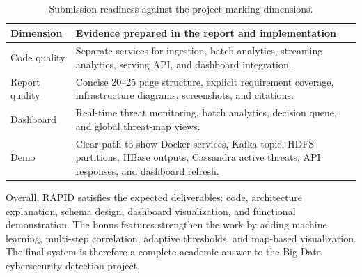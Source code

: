 \begin{table}[H]
\centering
\caption{Submission readiness against the project marking dimensions.}
\label{tab:grading_readiness}
\small
\begin{tabularx}{\textwidth}{p{}X}
\toprule
\textbf{Dimension} & \textbf{Evidence prepared in the report and implementation} \\
\midrule
Code quality & Separate services for ingestion, batch analytics, streaming analytics, serving API, and dashboard integration. \\
Report quality & Concise 20--25 page structure, explicit requirement coverage, infrastructure diagrams, screenshots, and citations. \\
Dashboard & Real-time threat monitoring, batch analytics, decision queue, and global threat-map views. \\
Demo & Clear path to show Docker services, Kafka topic, HDFS partitions, HBase outputs, Cassandra active threats, API responses, and dashboard refresh. \\
\bottomrule
\end{tabularx}
\end{table}

Overall, RAPID satisfies the expected deliverables: code, architecture explanation, schema design, dashboard visualization, and functional demonstration. The bonus features strengthen the work by adding machine learning, multi-step correlation, adaptive thresholds, and map-based visualization. The final system is therefore a complete academic answer to the Big Data cybersecurity detection project.
